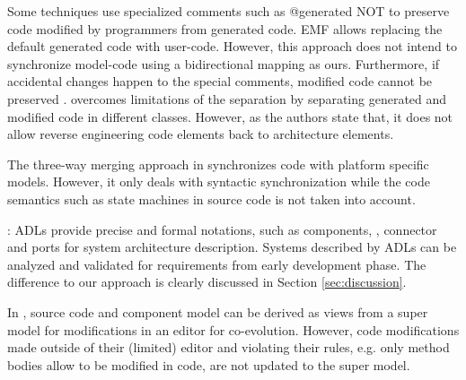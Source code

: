 
Some techniques use specialized comments \cite{steinberg2008emf} such as \textsf{@generated NOT} to preserve code modified by programmers from generated code. 
EMF allows replacing the default generated code with user-code.
However, this approach does not intend to synchronize model-code using a bidirectional mapping as ours.
Furthermore, if accidental changes happen to the special comments, modified code cannot be preserved \cite{zheng2012enhancing}.
 \cite{zheng2012enhancing} overcomes limitations of the separation by separating generated and modified code in different classes.
However, as the authors state that, 
it does not allow reverse engineering code elements back to architecture elements.  

The three-way merging approach in \cite{angyal_synchronizing_2008} synchronizes code with platform specific models.
However, it only deals with syntactic synchronization while the code semantics such as state machines in source code is not taken into account.

\noindent
{}:
ADLs provide precise and formal notations, such as components, , connector and ports for system architecture description.
Systems described by ADLs can be analyzed and validated for requirements from early development phase.
The difference to our approach is clearly discussed in Section \ref{sec:discussion}.


\noindent
{}
In \cite{kramer2015change}, source code and component model can be derived as views from a super model for modifications in an editor for co-evolution.
However, code modifications made outside of their (limited) editor and violating their rules, e.g. only method bodies allow to be modified in code, are not updated to the super model. 
 




